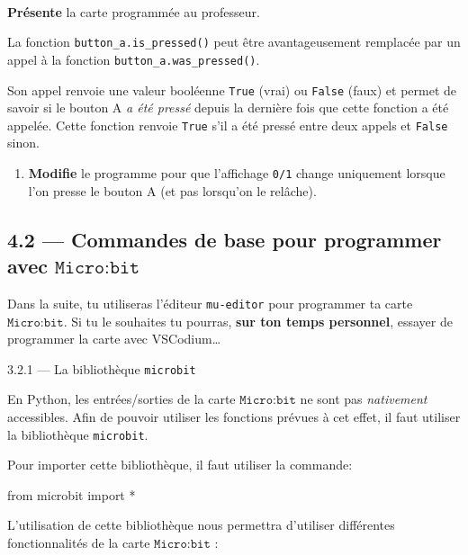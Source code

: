 \documentclass[a4paper,17pt]{extarticle}
\newenvironment{eleve}%
{\begin{activite}\color{noiramu}\\[-0.5cm]}
{\end{activite}}
\providecommand{\tightlist}{%
      \setlength{\itemsep}{0pt}\setlength{\parskip}{0pt}}
\newenvironment{Shaded}{}{}
\newcommand{\NormalTok}[1]{{#1}}
\newcommand{\ImportTok}[1]{{#1}}
\newcommand{\OperatorTok}[1]{\textcolor[rgb]{0.40,0.40,0.40}{{#1}}}
\begin{document}
\begin{eleve}
\textbf{Présente} la carte programmée au professeur.

La fonction \texttt{button\_a.is\_pressed()} peut être avantageusement
remplacée par un appel à la fonction \texttt{button\_a.was\_pressed()}.

Son appel renvoie une valeur booléenne \texttt{True} (vrai) ou
\texttt{False} (faux) et permet de savoir si le bouton A \emph{a été
pressé} depuis la dernière fois que cette fonction a été appelée. Cette
fonction renvoie \texttt{True} s'il a été pressé entre deux appels et
\texttt{False} sinon.

\begin{enumerate}
\def\labelenumi{\arabic{enumi}.}
\setcounter{enumi}{5}
\tightlist
\item
  \textbf{Modifie} le programme pour que l'affichage \texttt{0/1} change
  uniquement lorsque l'on presse le bouton A (et pas lorsqu'on le
  relâche).
\end{enumerate}
        
        \end{eleve}
    \hypertarget{commandes-de-base-pour-programmer-avec-textttmicrobit}{%
\subsection{\texorpdfstring{4.2 --- Commandes de base pour programmer
avec
\(\texttt{Micro:bit}\)}{4.2 --- Commandes de base pour programmer avec \textbackslash texttt\{Micro:bit\}}}\label{commandes-de-base-pour-programmer-avec-textttmicrobit}}

    Dans la suite, tu utiliseras l'éditeur \texttt{mu-editor} pour
programmer ta carte \(\texttt{Micro:bit}\). Si tu le souhaites tu
pourras, \textbf{sur ton temps personnel}, essayer de programmer la
carte avec VSCodium\ldots{}

    3.2.1 --- La bibliothèque \texttt{microbit}

    En Python, les entrées/sorties de la carte \(\texttt{Micro:bit}\) ne
sont pas \emph{nativement} accessibles. Afin de pouvoir utiliser les
fonctions prévues à cet effet, il faut utiliser la bibliothèque
\texttt{microbit}.
\begin{exemple}
    Pour importer cette bibliothèque, il faut utiliser la commande:

\begin{Shaded}
\begin{Highlighting}[]
\ImportTok{from}\NormalTok{ microbit }\ImportTok{import} \OperatorTok{*}
\end{Highlighting}
\end{Shaded}

        \end{exemple}
    L'utilisation de cette bibliothèque nous permettra d'utiliser
différentes fonctionnalités de la carte \(\texttt{Micro:bit}\) :
\end{document}
